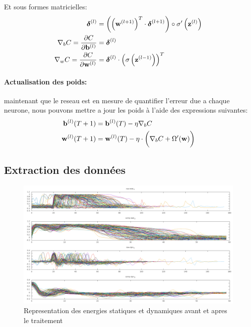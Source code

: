 \documentclass[11pt]{article}
\begin{document}
Et sous formes matricielles:
\begin{equation}
	\begin{aligned}
		\boldsymbol \delta^{(l)} &= \left(\left({\bf w}^{(l+1)} \right)^{T}
		\cdot \boldsymbol \delta^{(l+1)} \right)
		\circ \sigma'\left( {\bf z}^{(l)}\right) \\
		\nabla_bC = \frac{\partial C}{\partial {\bf b}^{(l)}} &=
		\boldsymbol\delta^{(l)}  \\
		\nabla_wC = \frac{\partial C}{\partial {\bf w}^{(l)}} &=
		\boldsymbol\delta^{(l)} \cdot \left(\sigma\left({\bf z}^{(l-1)}\right)\right)^{T}\\
	\end{aligned}
\end{equation}

\paragraph{Actualisation des poids:} maintenant que le reseau est en mesure de
quantifier l'erreur due a chaque neurone, nous pouvons mettre a jour les poids
\`a l'aide des expressions suivantes:
\begin{equation}
	\begin{aligned}
		{\bf b}^{(l)}(T+1) &= {\bf b}^{(l)}(T) - \eta \nabla_bC \\
		{\bf w}^{(l)}(T+1) &= {\bf w}^{(l)}(T) - \eta \cdot \bigg( \nabla_bC + \Omega'({\bf w})\bigg)\\
	\end{aligned}
\end{equation}



\subsection{Extraction des donn\'ees}

\begin{figure}[h]
	\centering
	\includegraphics[scale=.3]{img/preprocessing.png}
	\caption{Representation des energies statiques et dynamiques avant et
	apres le traitement}
\end{figure}
\end{document}
